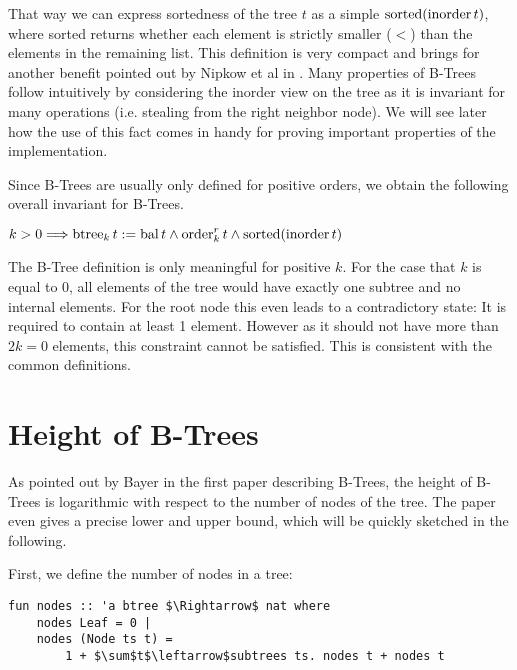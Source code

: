 That way we can express sortedness of the tree $t$ as a simple $\operatorname{sorted} (\operatorname{inorder} t)$,
where sorted returns whether each element is strictly smaller ($<$) than the elements in the remaining list.
This definition is very compact and brings for another benefit pointed out by Nipkow et al in \parencite{DBLP:conf/itp/Nipkow16}.
Many properties of B-Trees follow intuitively by considering
the inorder view on the tree as it is invariant for many operations (i.e. stealing from the right neighbor node).
We will see later how the use of this fact comes in handy for proving
important properties of the implementation.

Since B-Trees are usually only defined for positive
orders, we obtain the following overall invariant for B-Trees.
\begin{definition}
    $k > 0 \Longrightarrow \operatorname{btree}_k t := \operatorname{bal} t \wedge \operatorname{order}^r_k t \wedge \operatorname{sorted} (\operatorname{inorder} t)$
\end{definition}

The B-Tree definition is only meaningful for positive $k$.
For the case that $k$ is equal to 0,
all elements of the tree would have exactly one subtree
and no internal elements.
For the root node this even leads to a contradictory state:
It is required to contain at least 1 element.
However as it should not have more than $2k=0$ elements,
this constraint cannot be satisfied.
This is consistent with the common definitions.

\section{Height of B-Trees}

As pointed out by Bayer in the first paper describing B-Trees,
the height of B-Trees is logarithmic with respect to the number
of nodes of the tree. \parencite{DBLP:journals/acta/BayerM72}
The paper even gives a precise lower and upper bound, which will be quickly sketched in the following.

First, we define the number of nodes in a tree:
\begin{lstlisting}[mathescape=true, language=Isabelle]
fun nodes :: 'a btree $\Rightarrow$ nat where
    nodes Leaf = 0 |
    nodes (Node ts t) =
        1 + $\sum$t$\leftarrow$subtrees ts. nodes t + nodes t
\end{lstlisting}


